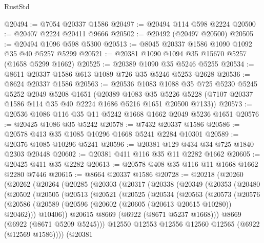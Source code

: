 \begin{lexlean}{RustStd}
\begin{coremodule}
@20494 := @7054 @20337 @1586
@20497 := @20494 @114 @598 @2224
@20500 := @20407 @2224 @20411 @9666
@20502 := @20492 (@20497 @20500)
@20505 := @20494 @1096 @598 @5300
@20513 := @8045 @20337 @1586 @1090 @1092 @35 @40 @5257 @5299
@20521 := @20381 @1090 @1094 @35 @15670 @5257 (@1658 @5299 @1662)
@20525 := @20389 @1090 @35 @5246 @5255
@20534 := @8611 @20337 @1586 @613 @1089 @726 @35 @5246 @5253 @2628
@20536 := @8624 @20337 @1586
@20563 := @20536
    @1083
    @1088
    @35
    @725
    @5230
    @5245
    @5252
    @2049
    @5208
    @1651
    (@20389
      @1083
      @35
      @5226
      @5228
      (@7107 @20337 @1586 @114 @35 @40 @2224 @1686 @5216 @1651 @20500 @7133))
@20573 := @20536 @1086 @116 @35 @11 @5242 @1668 @1662 @2049 @5236 @1651
@20576 := @20425 @1086 @35 @5242
@20578 := @7432 @20337 @1586
@20586 := @20578 @413 @35 @1085 @10296 @1668 @5241 @2284 @10301
@20589 := @20376 @1085 @10296 @5241
@20596 := @20381 @129 @434 @34 @725 @1840 @2303 @20448
@20602 := @20381 @411 @116 @35 @11 @2282 @1662
@20605 := @20425 @411 @35 @2282
@20613 := @20578 @408 @35 @116 @11 @1668 @1662 @2280 @7446
@20615 := @8664 @20337 @1586
@20728 := @20218
    (@20260
      (@20262
        (@20264
          (@20285
            (@20303
              (@20317
                (@20338
                  (@20349
                    (@20353
                      (@20480
                        (@20502
                          (@20505
                            (@20513
                              (@20521
                                (@20525
                                  (@20534
                                    (@20563
                                      (@20573
                                        (@20576
                                          (@20586
                                            (@20589
                                              (@20596
                                                (@20602 (@20605 (@20613 @20615 @10280)) @20462)))
                                            @10406))
                                        @20615
                                        @8669
                                        (@6922 (@8671 @5237 @1668)))
                                      @8669
                                      (@6922 (@8671 @5209 @5245)))
                                    @12550
                                    @12553
                                    @12556
                                    @12560
                                    @12565
                                    (@6922 (@12569 @1586))))
                                (@20381

\end{coremodule}
\end{lexlean}
